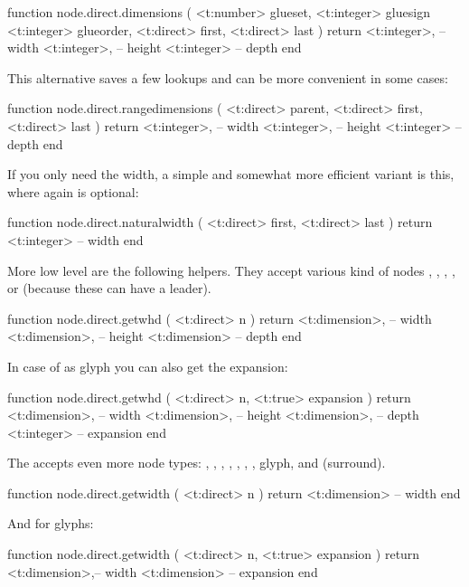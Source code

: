 \starttyping[option=LUA]
function node.direct.dimensions (
    <t:number>  glueset,
    <t:integer> gluesign
    <t:integer> glueorder,
    <t:direct>  first,
    <t:direct>  last
)
    return
        <t:integer>, -- width
        <t:integer>, -- height
        <t:integer>  -- depth
end
\stoptyping

This alternative saves a few lookups and can be more convenient in some
cases:

\starttyping[option=LUA]
function node.direct.rangedimensions (
    <t:direct> parent,
    <t:direct> first,
    <t:direct> last
)
    return
        <t:integer>, -- width
        <t:integer>, -- height
        <t:integer>  -- depth
end
\stoptyping

If you only need the width, a simple and somewhat more efficient variant is this,
where again  is optional:

\starttyping[option=LUA]
function node.direct.naturalwidth (
    <t:direct> first,
    <t:direct> last
)
    return <t:integer> -- width
end
\stoptyping

More low level are the following helpers. They accept various kind of nodes
, , , ,  or 
(because these can have a leader).

\starttyping[option=LUA]
function node.direct.getwhd ( <t:direct> n )
    return
        <t:dimension>, -- width
        <t:dimension>, -- height
        <t:dimension>  -- depth
end
\stoptyping

In case of as glyph you can also get the expansion:

\starttyping[option=LUA]
function node.direct.getwhd ( <t:direct> n, <t:true> expansion )
    return
        <t:dimension>, -- width
        <t:dimension>, -- height
        <t:dimension>, -- depth
        <t:integer>    -- expansion
end
\stoptyping

The  accepts even more node types: , ,
, , , , , \type
{glyph},  and  (surround).

\starttyping[option=LUA]
function node.direct.getwidth ( <t:direct> n )
    return <t:dimension> -- width
end
\stoptyping

And for glyphs:

\starttyping[option=LUA]
function node.direct.getwidth ( <t:direct> n, <t:true> expansion )
    return
        <t:dimension>,-- width
        <t:dimension> -- expansion
end
\stoptyping

